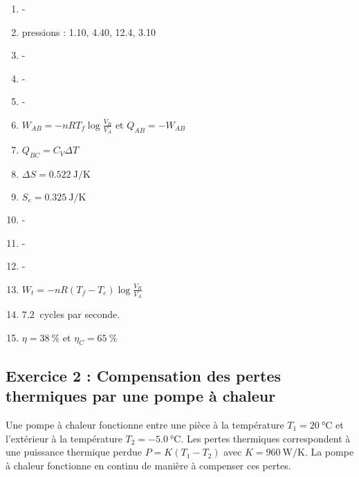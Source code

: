 \begin{enumerate}
	\item -
	\item pressions : 1.10, 4.40, 12.4, 3.10
	\item -
	\item -
	\item -
	\item $W_{AB} = -n R T_f \log{\frac{V_B}{V_A}}$ et $Q_{AB} = -W_{AB}$
	\item $Q_{BC} = C_V \Delta T$
	\item $\Delta S = \SI{0.522}{\joule\per\kelvin}$
	\item $S_e = \SI{0.325}{\joule\per\kelvin}$
	\item -
	\item -
	\item -
	\item $W_t = -nR(T_f-T_c)\log{\frac{V_B}{V_A}}$
	\item $\SI{7.2}{}$ cycles par seconde.
	\item $\eta = \SI{38}{\percent}$ et $\eta_C = \SI{65}{\percent}$
\end{enumerate}

\subsection{Exercice 2 : Compensation des pertes thermiques par une pompe à chaleur}

Une pompe à chaleur fonctionne entre une pièce à la température $T_1 = \SI{20}{\degreeCelsius}$ et l'extérieur à la température $T_2 = \SI{-5.0}{\degreeCelsius}$. Les pertes thermiques correspondent à une puissance thermique perdue $P = K(T_1-T_2)$ avec $K = \SI{960}{\watt\per\kelvin}$. La pompe à chaleur fonctionne en continu de manière à compenser ces pertes.

